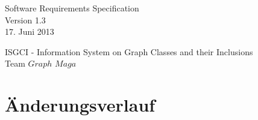 \documentclass[10pt,a4paper]{article}
\begin{document}
\thispagestyle{empty} %
\vspace*{5cm} 
\begin{center}
{\huge Software Requirements Specification}\\
{\large Version 1.3}\\
{\large 17. Juni 2013}\\
\end{center}

\begin{center}
{\large ISGCI - Information System on Graph Classes and their Inclusions}\\
{\large Team $Graph$ $Maga$}
\end{center}




 
 
 
 \newpage
 
 \renewcommand{\contentsname}{Inhaltsverzeichnis}
 \tableofcontents %

\vfill 
 \section{Änderungsverlauf}
\end{document}
